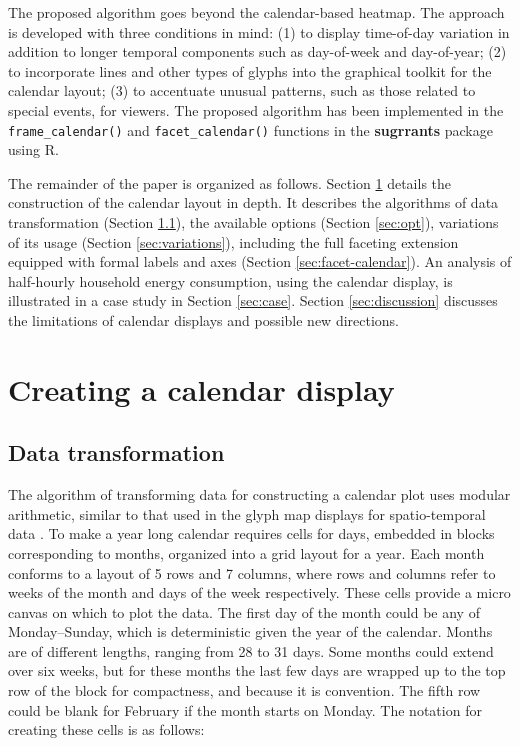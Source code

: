 \documentclass[12pt]{article}
\begin{document}
The proposed algorithm goes beyond the calendar-based heatmap. The approach is developed with three conditions in mind: (1) to display time-of-day variation in addition to longer temporal components such as day-of-week and day-of-year; (2) to incorporate lines and other types of glyphs into the graphical toolkit for the calendar layout; (3) to accentuate unusual patterns, such as those related to special events, for viewers. The proposed algorithm has been implemented in the \texttt{frame\_calendar()} and \texttt{facet\_calendar()} functions in the \textbf{sugrrants} package using R.

The remainder of the paper is organized as follows. Section \ref{sec:algorithm} details the construction of the calendar layout in depth. It describes the algorithms of data transformation (Section \ref{sec:transformation}), the available options (Section \ref{sec:opt}), variations of its usage (Section \ref{sec:variations}), including the full faceting extension equipped with formal labels and axes (Section \ref{sec:facet-calendar}). An analysis of half-hourly household energy consumption, using the calendar display, is illustrated in a case study in Section \ref{sec:case}. Section \ref{sec:discussion} discusses the limitations of calendar displays and possible new directions.

\hypertarget{sec:algorithm}{%
\section{Creating a calendar display}\label{sec:algorithm}}

\hypertarget{sec:transformation}{%
\subsection{Data transformation}\label{sec:transformation}}

The algorithm of transforming data for constructing a calendar plot uses modular arithmetic, similar to that used in the glyph map displays for spatio-temporal data \citep{Wickham2012glyph}. To make a year long calendar requires cells for days, embedded in blocks corresponding to months, organized into a grid layout for a year. Each month conforms to a layout of 5 rows and 7 columns, where rows and columns refer to weeks of the month and days of the week respectively. These cells provide a micro canvas on which to plot the data. The first day of the month could be any of Monday--Sunday, which is deterministic given the year of the calendar. Months are of different lengths, ranging from 28 to 31 days. Some months could extend over six weeks, but for these months the last few days are wrapped up to the top row of the block for compactness, and because it is convention. The fifth row could be blank for February if the month starts on Monday. The notation for creating these cells is as follows:
\end{document}
